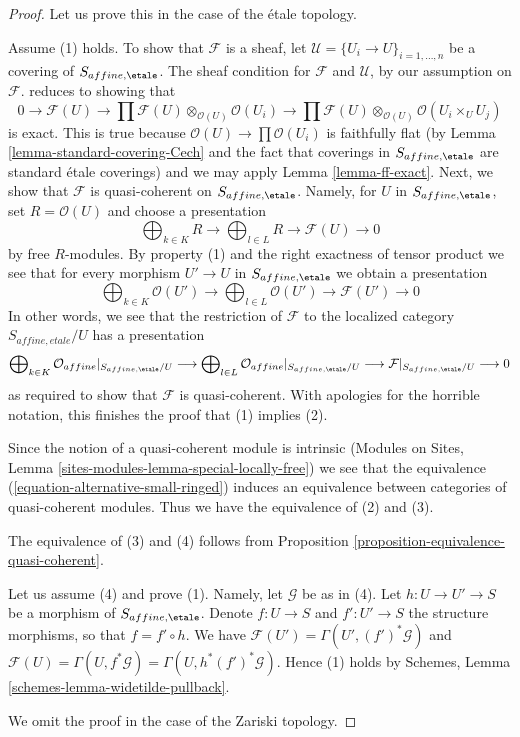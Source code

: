 \begin{proof}
Let us prove this in the case of the \'etale topology.

\medskip\noindent
Assume (1) holds. To show that $\mathcal{F}$ is a sheaf, let
$\mathcal{U} = \{U_i \to U\}_{i = 1, \ldots, n}$ be a covering
of $S_{affine, \etale}$. The sheaf condition for $\mathcal{F}$
and $\mathcal{U}$, by our assumption on $\mathcal{F}$.
reduces to showing that
$$
0 \to \mathcal{F}(U) \to
\prod \mathcal{F}(U) \otimes_{\mathcal{O}(U)} \mathcal{O}(U_i) \to
\prod \mathcal{F}(U) \otimes_{\mathcal{O}(U)} \mathcal{O}(U_i \times_U U_j)
$$
is exact. This is true because $\mathcal{O}(U) \to \prod \mathcal{O}(U_i)$
is faithfully flat (by Lemma \ref{lemma-standard-covering-Cech} and
the fact that coverings in $S_{affine, \etale}$ are standard \'etale
coverings) and we may apply Lemma \ref{lemma-ff-exact}.
Next, we show that $\mathcal{F}$ is quasi-coherent on $S_{affine, \etale}$.
Namely, for $U$ in $S_{affine, \etale}$, set $R = \mathcal{O}(U)$
and choose a presentation
$$
\bigoplus\nolimits_{k \in K} R
\longrightarrow
\bigoplus\nolimits_{l \in L} R
\longrightarrow
\mathcal{F}(U)
\longrightarrow 0
$$
by free $R$-modules. By property (1) and the right exactness of tensor product
we see that for every morphism $U' \to U$ in $S_{affine, \etale}$
we obtain a presentation
$$
\bigoplus\nolimits_{k \in K} \mathcal{O}(U')
\longrightarrow
\bigoplus\nolimits_{l \in L} \mathcal{O}(U')
\longrightarrow
\mathcal{F}(U')
\longrightarrow 0
$$
In other words, we see that the restriction of $\mathcal{F}$
to the localized category $S_{affine, etale}/U$ has a presentation
$$
\bigoplus\nolimits_{k \in K} \mathcal{O}_{affine}|_{S_{affine, \etale}/U}
\longrightarrow
\bigoplus\nolimits_{l \in L} \mathcal{O}_{affine}|_{S_{affine, \etale}/U}
\longrightarrow
\mathcal{F}|_{S_{affine, \etale}/U}
\longrightarrow 0
$$
as required to show that $\mathcal{F}$ is quasi-coherent.
With apologies for the horrible notation, this finishes the proof
that (1) implies (2).

\medskip\noindent
Since the notion of a quasi-coherent module is intrinsic
(Modules on Sites, Lemma \ref{sites-modules-lemma-special-locally-free})
we see that the equivalence (\ref{equation-alternative-small-ringed})
induces an equivalence between categories of quasi-coherent modules.
Thus we have the equivalence of (2) and (3).

\medskip\noindent
The equivalence of (3) and (4) follows from
Proposition \ref{proposition-equivalence-quasi-coherent}.

\medskip\noindent
Let us assume (4) and prove (1). Namely, let
$\mathcal{G}$ be as in (4). Let $h : U \to U' \to S$ be a morphism
of $S_{affine, \etale}$. Denote $f : U \to S$ and $f' : U' \to S$ the
structure morphisms, so that $f = f' \circ h$.
We have $\mathcal{F}(U') = \Gamma(U', (f')^*\mathcal{G})$ and
$\mathcal{F}(U) = \Gamma(U, f^*\mathcal{G}) = \Gamma(U, h^*(f')^*\mathcal{G})$.
Hence (1) holds by Schemes, Lemma \ref{schemes-lemma-widetilde-pullback}.

\medskip\noindent
We omit the proof in the case of the Zariski topology.
\end{proof}





